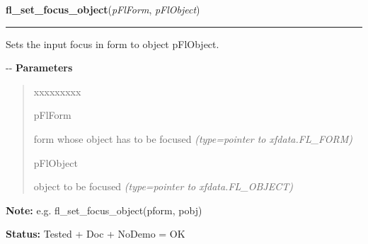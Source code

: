 \hspace{.8\funcindent}\begin{boxedminipage}{\funcwidth}

    \raggedright \textbf{fl\_set\_focus\_object}(\textit{pFlForm}, \textit{pFlObject})

    \vspace{-1.5ex}

    \rule{\textwidth}{0.5\fboxrule}
\setlength{\parskip}{2ex}

Sets the input focus in form to object pFlObject.

-{}-
\setlength{\parskip}{1ex}
      \textbf{Parameters}
      \vspace{-1ex}

      \begin{quote}
        \begin{Ventry}{xxxxxxxxx}

          \item[pFlForm]


form whose object has to be focused
            {\it (type=pointer to xfdata.FL\_FORM)}

          \item[pFlObject]


object to be focused
            {\it (type=pointer to xfdata.FL\_OBJECT)}

        \end{Ventry}

      \end{quote}

\textbf{Note:} 
e.g. fl\_set\_focus\_object(pform, pobj)


\textbf{Status:} 
Tested + Doc + NoDemo = OK


    \end{boxedminipage}

    \label{xformslib:flbasic:fl_set_focus_object}

    \vspace{0.5ex}

